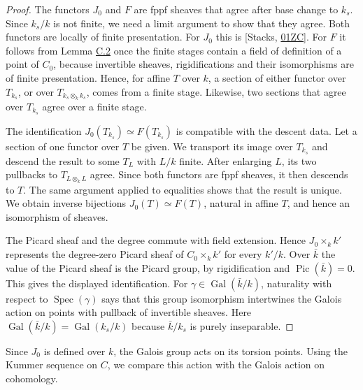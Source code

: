 \documentclass[11pt]{article}
\begin{document}
\begin{proof}[{Proof}]
The functors \(J_0\) and \(F\) are fppf sheaves that agree after base change to \(k_s\). Since \(k_s/k\) is not finite, we need a limit argument to show that they agree. Both functors are locally of finite presentation. For \(J_0\) this is [Stacks, \href{https://stacks.math.columbia.edu/tag/01ZC}{01ZC}]. For \(F\) it follows from Lemma \hyperref[bp7]{C.2} once the finite stages contain a field of definition of a point of \(C_0\), because invertible sheaves, rigidifications and their isomorphisms are of finite presentation. Hence, for affine \(T\) over \(k\), a section of either functor over \(T_{k_s}\), or over \(T_{k_s\otimes_kk_s}\), comes from a finite stage. Likewise, two sections that agree over \(T_{k_s}\) agree over a finite stage.

The identification \(J_0(T_{k_s})\simeq F(T_{k_s})\) is compatible with the descent data. Let a section of one functor over \(T\) be given. We transport its image over \(T_{k_s}\) and descend the result to some \(T_L\) with \(L/k\) finite. After enlarging \(L\), its two pullbacks to \(T_{L\otimes_kL}\) agree. Since both functors are fppf sheaves, it then descends to \(T\). The same argument applied to equalities shows that the result is unique. We obtain inverse bijections \(J_0(T)\simeq F(T)\), natural in affine \(T\), and hence an isomorphism of sheaves.

The Picard sheaf and the degree commute with field extension. Hence \(J_0\times_kk'\) represents the degree-zero Picard sheaf of \(C_0\times_kk'\) for every \(k'/k\). Over \(\bar k\) the value of the Picard sheaf is the Picard group, by rigidification and \(\operatorname{Pic}(\bar k)=0\). This gives the displayed identification. For \(\gamma\in\operatorname{Gal}(\bar k/k)\), naturality with respect to \(\operatorname{Spec}(\gamma)\) says that this group isomorphism intertwines the Galois action on points with pullback of invertible sheaves. Here \(\operatorname{Gal}(\bar k/k)=\operatorname{Gal}(k_s/k)\) because \(\bar k/k_s\) is purely inseparable.
\end{proof}

\label{bp51}%
Since \(J_0\) is defined over \(k\), the Galois group acts on its torsion points. Using the Kummer sequence on \(C\), we compare this action with the Galois action on cohomology.
\end{document}
